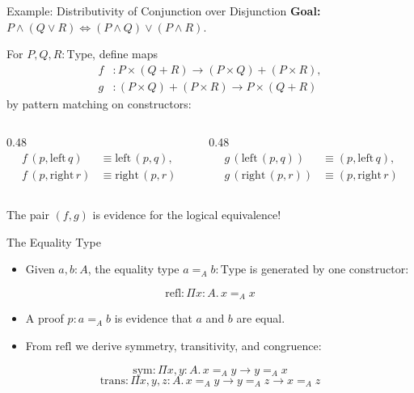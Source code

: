 \documentclass[aspectratio=169,11pt]{beamer}
\begin{document}
\begin{frame}{Example: Distributivity of Conjunction over Disjunction}
  \small
  \textbf{Goal:}\;
  \(P \wedge (Q \vee R) \Leftrightarrow (P \wedge Q) \vee (P \wedge R)\).

  \vspace{0.3em}
  For \(P, Q, R : \mathrm{Type}\), define maps
  \[
    \begin{aligned}
      f &: P \times (Q + R) \to (P \times Q) + (P \times R), \\
      g &: (P \times Q) + (P \times R) \to P \times (Q + R)
    \end{aligned}
  \]
  by pattern matching on constructors:

  \vspace{0.2em}
  \begin{columns}[T,totalwidth=\textwidth]
    \begin{column}{0.48\textwidth}
      \[
        \begin{aligned}
          f\,(p, \mathrm{left}\,q) &\equiv \mathrm{left}\,(p, q), \\
          f\,(p, \mathrm{right}\,r) &\equiv \mathrm{right}\,(p, r)
        \end{aligned}
      \]
    \end{column}
    \begin{column}{0.48\textwidth}
      \[
        \begin{aligned}
          g\,(\mathrm{left}\,(p, q)) &\equiv (p, \mathrm{left}\,q), \\
          g\,(\mathrm{right}\,(p, r)) &\equiv (p, \mathrm{right}\,r)
        \end{aligned}
      \]
    \end{column}
  \end{columns}

  \vspace{0.8em}
  The pair \((f, g)\) is evidence for the logical equivalence!
\end{frame}

\begin{frame}{The Equality Type}
  \begin{itemize}
    \item Given \(a, b : A\), the equality type \(a =_A b : \mathrm{Type}\) is generated by one constructor:
  \end{itemize}

  \vspace{0.4em}
  \[
    \mathrm{refl} : \Pi x : A.\, x =_A x
  \]

  \vspace{0.4em}
  \begin{itemize}
    \item A proof \(p : a =_A b\) is evidence that \(a\) and \(b\) are equal.
    \item From \(\mathrm{refl}\) we derive symmetry, transitivity, and congruence:
  \end{itemize}

  \vspace{0.2em}
  \small
  \[
    \mathrm{sym} : \Pi x, y : A.\, x =_A y \to y =_A x
  \]
  \[
    \mathrm{trans} : \Pi x, y, z : A.\, x =_A y \to y =_A z \to x =_A z
  \]
\end{frame}
\end{document}

